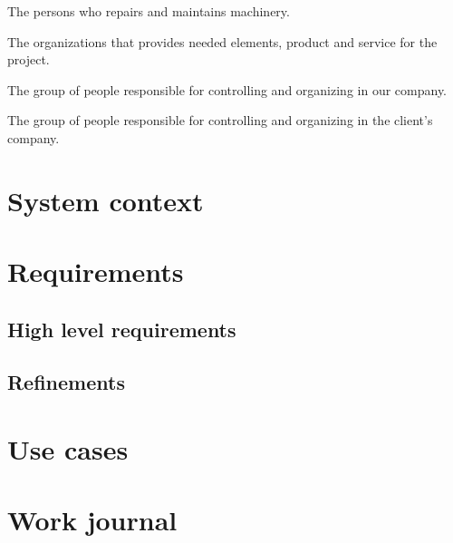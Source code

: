 \documentclass[a4paper]{article}
\begin{document}
\begin{description}[align=right,leftmargin=6cm,style=multiline]
	\item[mechanics]
			The persons who repairs and maintains machinery.

	\item[suppliers]
			The organizations that provides needed elements, product
			and service for the project.

	\item[our company’s management]
			The group of people responsible for controlling and
			organizing in our company.

	\item[client's management]
			The group of people responsible for controlling and
			organizing in the client's company.
\end{description}



\section{System context}



\section{Requirements}

\subsection{High level requirements}


\subsection{Refinements}



\section{Use cases}




\section{Work journal}


\clearpage
\printglossaries %
\end{document}
